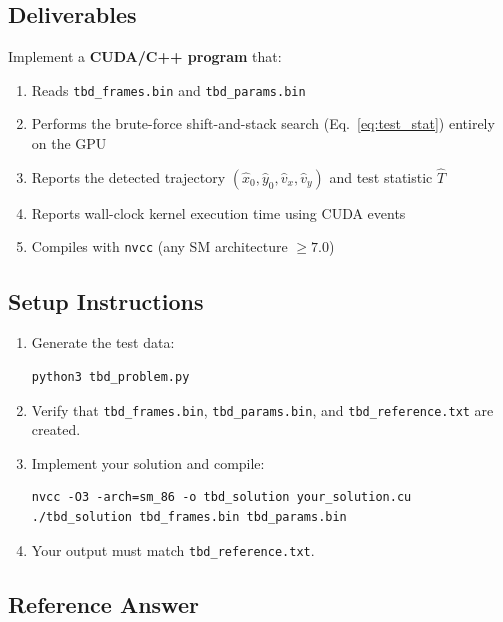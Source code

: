 \documentclass[11pt,letterpaper]{article}
\begin{document}
\subsection{Deliverables}

Implement a \textbf{CUDA/C++ program} that:
\begin{enumerate}[leftmargin=2em]
    \item Reads \texttt{tbd\_frames.bin} and \texttt{tbd\_params.bin}
    \item Performs the brute-force shift-and-stack search
          (Eq.~\ref{eq:test_stat}) entirely on the GPU
    \item Reports the detected trajectory
          $(\hat{x}_0, \hat{y}_0, \hat{v}_x, \hat{v}_y)$ and test
          statistic $\hat{T}$
    \item Reports wall-clock kernel execution time using CUDA events
    \item Compiles with \texttt{nvcc} (any SM architecture $\geq 7.0$)
\end{enumerate}

\subsection{Setup Instructions}

\begin{enumerate}[leftmargin=2em]
    \item Generate the test data:
\begin{lstlisting}[style=pythonstyle, numbers=none, xleftmargin=1em, framexleftmargin=0em]
python3 tbd_problem.py
\end{lstlisting}
    \item Verify that \texttt{tbd\_frames.bin}, \texttt{tbd\_params.bin},
          and \texttt{tbd\_reference.txt} are created.
    \item Implement your solution and compile:
\begin{lstlisting}[style=cudastyle, numbers=none, xleftmargin=1em, framexleftmargin=0em]
nvcc -O3 -arch=sm_86 -o tbd_solution your_solution.cu
./tbd_solution tbd_frames.bin tbd_params.bin
\end{lstlisting}
    \item Your output must match \texttt{tbd\_reference.txt}.
\end{enumerate}

\subsection{Reference Answer}
\end{document}
